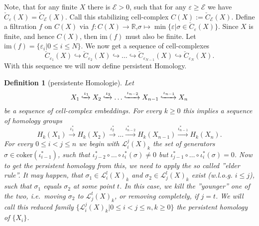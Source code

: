 \documentclass[11pt, a4paper,draft]{report}
\newtheorem{definition}{Definition}
\newcommand{\bR}{\mathbb{R}}
\newcommand{\im}{\textrm{im}}
\newcommand{\coker}{\textrm{coker}}
\begin{document}
    Note, that for any finite $X$ there is  $\mathcal{E}>0$, such that for any $\varepsilon\geq\mathcal{E}$ we have  $\check C_\varepsilon(X) = \check C_\mathcal{E}(X)$.
    Call this stabilizing cell-complex $C(X):=\check C_\mathcal{E}(X)$.
    Define a filtration $f$ on $C(X)$ via $f:C(X)\rightarrow\bR$,$\sigma\mapsto\min\{\varepsilon|\sigma\in \check C_\varepsilon(X)\}$.
    Since $X$ is finite, and hence $C(X)$, then $\im(f)$ must also be finite.
    Let $\im(f)=\{\varepsilon_i|0\leq i\leq N\}$.
    We now get a sequence of cell-complexes \[\check C_{\varepsilon_1}(X)\hookrightarrow \check C_{\varepsilon_2}(X)\hookrightarrow \ldots \hookrightarrow \check C_{\varepsilon_{N-1}}(X)\hookrightarrow \check C_{\varepsilon_N}(X).\]
    With this sequence we will now define persistent Homology.

    \begin{definition}[persistente Homologie]
        Let \[X_1\xhookrightarrow{\iota_1} X_2\xhookrightarrow{\iota_2} \ldots\xhookrightarrow{\iota_{n-2}} X_{n-1}\xhookrightarrow{\iota_{n-1}} X_n\] be a sequence of cell-complex embeddings.
        For every $k\geq 0$ this implies a sequence of homology groups
        \[H_k(X_1)\xrightarrow{\iota_{1}^*} H_k(X_2)\xrightarrow{\iota_{2}^*}\ldots \xrightarrow{\iota_{n-2}^*} H_k(X_{n-1})\xrightarrow{\iota_{n-1}^*} H_k(X_n).\]
        For every $0\leq i<j\leq n$ we begin with $\mathcal{L}_i^j(X)_k$ the set of generators $\sigma\in\coker(\iota_{i-1}^*)$, such that $\iota_{j-2}^*\circ\ldots\circ\iota_{i}^*(\sigma)\neq0$ but $\iota_{j-1}^*\circ\ldots\circ\iota_{i}^*(\sigma)=0$.
        Now to get the persistent homology from this, we need to apply the so called ''elder rule''.
        It may happen, that $\sigma_1\in\mathcal{L}_i^l(X)_k$ and $\sigma_2\in\mathcal{L}_j^l(X)_k$ exist (w.l.o.g. $i\leq j$), such that $\sigma_1$ equals $\sigma_2$ at some point $t$.
        In this case, we kill the ''younger'' one of the two, i.e.\ moving $\sigma_2$ to $\mathcal{L}_j^t(X)_k$, or removing completely, if $j=t$.
        We will call this reduced family $\{\mathcal{L}_i^j(X)_k|0\leq i<j\leq n,k\geq0\}$ the persistent homology of $\{X_i\}$.
    \end{definition}
\end{document}
